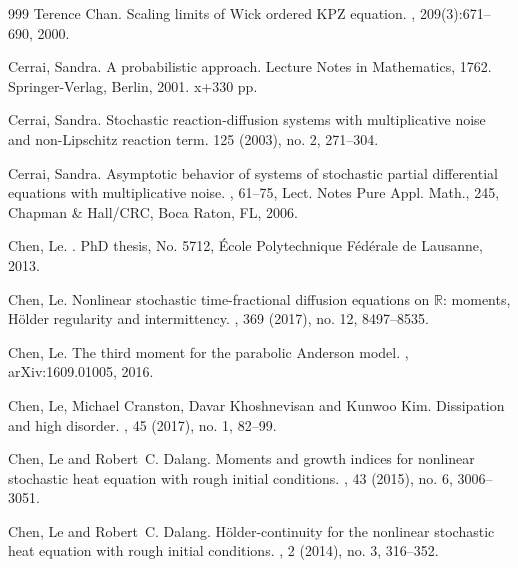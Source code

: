 \documentclass[a4paper,12pt]{article}
\theoremstyle{plain}
\theoremstyle{definition}
\newcommand{\R}{\mathbb{R}}
\begin{document}
\begin{thebibliography}{999}
Terence Chan.
\newblock Scaling limits of {W}ick ordered {KPZ} equation.
, 209(3):671--690, 2000.

Cerrai, Sandra.
\newblock A probabilistic approach. Lecture Notes in Mathematics, 1762. Springer-Verlag, Berlin, 2001. x+330 pp. 

Cerrai, Sandra.
\newblock Stochastic reaction-diffusion systems with multiplicative noise and non-Lipschitz reaction term.
 125 (2003), no. 2, 271--304. 

Cerrai, Sandra.
\newblock Asymptotic behavior of systems of stochastic partial differential equations with multiplicative noise. 
, 61--75, 
Lect. Notes Pure Appl. Math., 245, Chapman \& Hall/CRC, Boca Raton, FL, 2006. 


Chen, Le.
.
\newblock PhD thesis, No. 5712, \'Ecole Polytechnique F\'ed\'erale de Lausanne, 
2013.

Chen, Le.
\newblock Nonlinear stochastic time-fractional diffusion equations on $\R$: moments, H\"older regularity and intermittency.
, 369 (2017), no. 12, 8497--8535.

Chen, Le.
\newblock The third moment for the parabolic Anderson model. 
, arXiv:1609.01005, 2016.

Chen, Le, Michael Cranston, Davar Khoshnevisan and Kunwoo Kim.
\newblock Dissipation and high disorder.
, 45 (2017), no. 1, 82--99.

Chen, Le and Robert~C. Dalang.
\newblock Moments and growth indices for nonlinear stochastic heat equation with rough initial conditions.
, 43 (2015), no. 6, 3006--3051.

Chen, Le  and Robert~C. Dalang.
\newblock H\"older-continuity for the nonlinear stochastic heat equation with rough initial conditions.
, 2 (2014), no. 3, 316--352.


\end{thebibliography}
\end{document}
